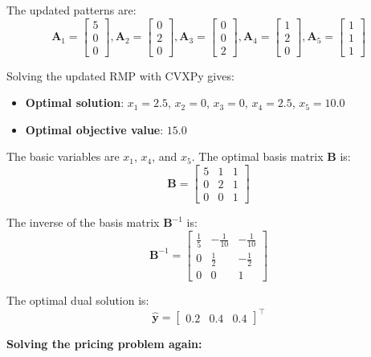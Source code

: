 \documentclass[11pt]{article}
\newcommand{\mb}[1]{\ensuremath{\boldsymbol{#1}}}
\begin{document}
\begin{enumerate}
\begin{enumerate}
The updated patterns are:
$$\mb{A}_1 = \begin{bmatrix} 5 \\ 0 \\ 0\end{bmatrix}, \mb{A}_2 = \begin{bmatrix} 0 \\ 2 \\ 0\end{bmatrix}, \mb{A}_3 = \begin{bmatrix} 0 \\ 0 \\2\end{bmatrix}, \mb{A}_4 = \begin{bmatrix} 1 \\ 2 \\ 0\end{bmatrix}, \mb{A}_5 = \begin{bmatrix} 1 \\ 1 \\ 1\end{bmatrix}$$

Solving the updated RMP with CVXPy gives:
\begin{itemize}
\item \textbf{Optimal solution}: $x_1 = 2.5$, $x_2 = 0$, $x_3 = 0$, $x_4 = 2.5$, $x_5 = 10.0$
\item \textbf{Optimal objective value}: $15.0$
\end{itemize}

The basic variables are $x_1$, $x_4$, and $x_5$. The optimal basis matrix $\mb{B}$ is:
$$\mb{B} = \begin{bmatrix} 5 & 1 & 1 \\ 0 & 2 & 1 \\ 0 & 0 & 1 \end{bmatrix}$$

The inverse of the basis matrix $\mb{B}^{-1}$ is:
$$\mb{B}^{-1} = \begin{bmatrix} \frac{1}{5} & -\frac{1}{10} & -\frac{1}{10} \\ 0 & \frac{1}{2} & -\frac{1}{2} \\ 0 & 0 & 1 \end{bmatrix}$$

The optimal dual solution is:
$$\hat{\mb{y}} = \begin{bmatrix} 0.2 & 0.4 & 0.4 \end{bmatrix}^\top$$

\textbf{Solving the pricing problem again:}


\end{enumerate}
\end{enumerate}
\end{document}
